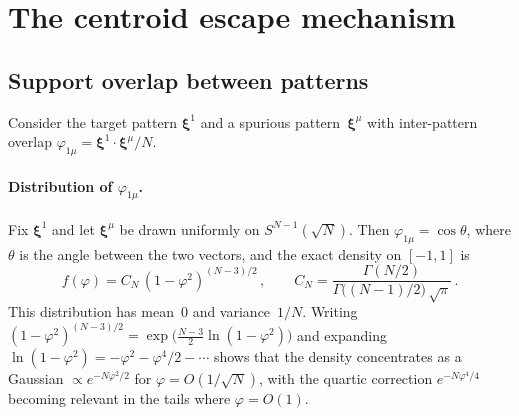 \documentclass[11pt]{article}
\newcommand{\bxi}{\boldsymbol{\xi}}
\begin{document}
\section{The centroid escape mechanism}

\subsection{Support overlap between patterns}

Consider the target pattern $\bxi^1$ and a spurious pattern~$\bxi^\mu$ with inter-pattern overlap $\varphi_{1\mu} = \bxi^1\!\cdot\bxi^\mu/N$.

\paragraph{Distribution of $\varphi_{1\mu}$.}
Fix $\bxi^1$ and let $\bxi^\mu$ be drawn uniformly on $S^{N-1}(\!\sqrt{N})$.  Then $\varphi_{1\mu} = \cos\theta$, where $\theta$ is the angle between the two vectors, and the exact density on $[-1,1]$ is
\begin{equation}
f(\varphi) = C_N\,(1 - \varphi^2)^{(N-3)/2}\,,\qquad
C_N = \frac{\Gamma(N/2)}{\Gamma\!\big((N\!-\!1)/2\big)\,\sqrt{\pi}}\,.
\label{eq:exact_density}
\end{equation}
This distribution has mean~$0$ and variance~$1/N$.  Writing $(1-\varphi^2)^{(N-3)/2} = \exp\!\big(\tfrac{N-3}{2}\ln(1-\varphi^2)\big)$ and expanding $\ln(1-\varphi^2) = -\varphi^2 - \varphi^4/2 - \cdots$ shows that the density concentrates as a Gaussian $\propto e^{-N\varphi^2/2}$ for $\varphi = O(1/\!\sqrt{N})$, with the quartic correction $e^{-N\varphi^4/4}$ becoming relevant in the tails where $\varphi = O(1)$.
\end{document}
